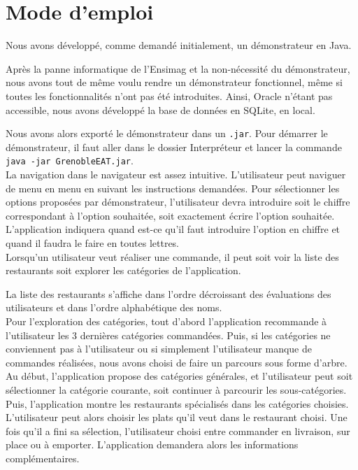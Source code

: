 \documentclass[10pt, a4paper]{article}
\begin{document}
\section{Mode d'emploi}

Nous avons développé, comme demandé initialement, un démonstrateur en Java.

Après la panne informatique de l'Ensimag et la non-nécessité du démonstrateur, nous avons tout de même voulu 
rendre un démonstrateur fonctionnel, même si toutes les fonctionnalités n'ont pas été introduites. Ainsi, Oracle n'étant pas accessible, 
nous avons développé la base de données en SQLite, en local.

Nous avons alors exporté le démonstrateur dans un \texttt{.jar}. Pour démarrer le démonstrateur, il faut aller 
dans le dossier Interpréteur et lancer la commande \texttt{java -jar GrenobleEAT.jar}. \\


La navigation dans le navigateur est assez intuitive. L'utilisateur peut naviguer de menu en menu en suivant 
les instructions demandées. Pour sélectionner les options proposées par  démonstrateur, l'utilisateur devra 
introduire soit le chiffre correspondant à l'option souhaitée, soit exactement écrire l'option souhaitée.
L'application indiquera quand est-ce qu'il faut introduire l'option en chiffre et quand il faudra le faire en toutes lettres. \\

Lorsqu'un utilisateur veut réaliser une commande, il peut soit voir la liste des restaurants soit explorer les catégories de l'application.

La liste des restaurants s'affiche dans l'ordre décroissant des évaluations des utilisateurs et dans l'ordre alphabétique des noms. \\

Pour l'exploration des catégories, tout d'abord l'application recommande à l'utilisateur les 3 dernières catégories
commandées. Puis, si les catégories ne conviennent pas à l'utilisateur ou si simplement l'utilisateur manque de commandes 
réalisées, nous avons choisi de faire un parcours sous forme d'arbre. Au début, l'application propose des catégories générales, et 
l'utilisateur peut soit sélectionner la catégorie courante, soit continuer à parcourir les sous-catégories. Puis, l'application montre 
les restaurants spécialisés dans les catégories choisies. \\

L'utilisateur peut alors choisir les plats qu'il veut dans le restaurant choisi. Une fois qu'il a fini sa sélection, l'utilisateur 
choisi entre commander en livraison, sur place ou à emporter. L'application demandera alors les informations complémentaires. \\
\end{document}
